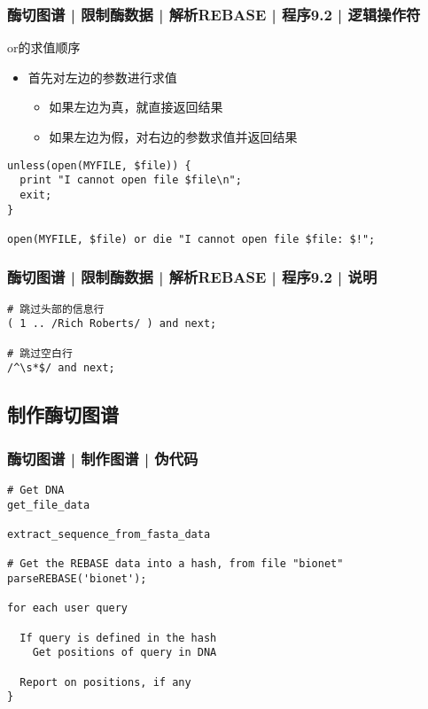 \begin{frame}[fragile]
  \frametitle{酶切图谱 | 限制酶数据 | 解析REBASE | 程序9.2 | \alert{逻辑操作符}}
  \begin{block}{or的求值顺序}
    \begin{itemize}
      \item 首先对左边的参数进行求值
	\begin{itemize}
	  \item 如果左边为真，就直接返回结果
	  \item 如果左边为假，对右边的参数求值并返回结果
	\end{itemize}
    \end{itemize}
  \end{block}
  \pause
\begin{lstlisting}
unless(open(MYFILE, $file)) {
  print "I cannot open file $file\n";
  exit;
}

open(MYFILE, $file) or die "I cannot open file $file: $!";
\end{lstlisting}
\end{frame}

\begin{frame}[fragile]
  \frametitle{酶切图谱 | 限制酶数据 | 解析REBASE | 程序9.2 | 说明}
\begin{lstlisting}
# 跳过头部的信息行
( 1 .. /Rich Roberts/ ) and next;

# 跳过空白行
/^\s*$/ and next;
\end{lstlisting}
\end{frame}

\subsection{制作酶切图谱}
\begin{frame}[fragile]
  \frametitle{酶切图谱 | 制作图谱 | 伪代码}
\begin{lstlisting}
# Get DNA
get_file_data

extract_sequence_from_fasta_data

# Get the REBASE data into a hash, from file "bionet"
parseREBASE('bionet');

for each user query

  If query is defined in the hash
    Get positions of query in DNA

  Report on positions, if any
}
\end{lstlisting}
\end{frame}

